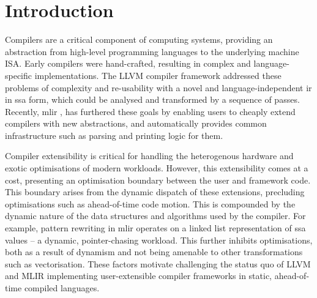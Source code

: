 \chapter{Introduction}
\label{chap:introduction}






Compilers are a critical component of computing systems, providing an abstraction %
from high-level programming languages to the underlying machine ISA.
Early compilers were hand-crafted, resulting in complex and language-specific implementations.
The LLVM compiler framework \cite{lattnerLLVMCompilationFramework2004} addressed these problems of complexity and re-usability with a novel and language-independent \ac{ir} in \ac{ssa} form, which could be analysed and transformed by a sequence of passes.
Recently, \ac{mlir} \cite{lattnerMLIRScalingCompiler2021a}, has furthered these goals by enabling users to cheaply extend compilers with new abstractions, and automatically provides common infrastructure such as parsing and printing logic for them.





Compiler extensibility is critical for handling the heterogenous hardware and exotic optimisations of modern workloads.
However, this extensibility comes at a cost, presenting an optimisation boundary between the user and framework code. This boundary arises from the dynamic dispatch of these extensions, precluding optimisations such as ahead-of-time code motion.
This is compounded by the dynamic nature of the data structures and algorithms used by the compiler. For example, pattern rewriting in \ac{mlir} operates on a linked list representation of \ac{ssa} values -- a dynamic, pointer-chasing workload.
This further inhibits optimisations, both as a result of dynamism and not being amenable to other transformations such as vectorisation.
These factors motivate challenging the status quo of LLVM and MLIR implementing user-extensible compiler frameworks in static, ahead-of-time compiled languages.






